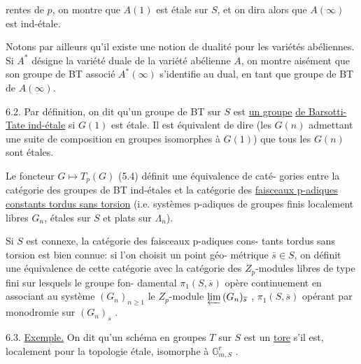 
rentes de $p$, on montre que $A(1)$ est étale sur $S$, et on dira alors
que $A(\infty)$ est ind-étale.

Notons par ailleurs qu'il existe une notion de dualité pour
les variétés abéliennes. Si $A^*$ désigne la variété duale de la variété
abélienne $A$, on montre aisément que son groupe de BT associé $A^*(\infty)$
s'identifie au dual, en tant que groupe de BT de $A(\infty)$.

6.2. Par définition, on dit qu'un groupe de BT sur $S$ est \uline{un groupe}
\uline{de Barsotti-Tate ind-étale} si $G(1)$ est étale. Il est équivalent de dire
(les $G(n)$ admettant une suite de composition en groupes isomorphes à
$G(1)$) que tous les $G(n)$ sont étales.

Le foncteur $G \mapsto T_p(G)$ (5.4) définit une équivalence de caté-%
gories entre la catégorie des groupes de BT ind-étales et la catégorie
des \uline{faisceaux p-adiques constants tordus sans torsion} (i.e. systèmes
p-adiques de groupes finis localement libres $G_n$, étales sur $S$ et plats
sur $\Lambda_n$).

Si $S$ est connexe, la catégorie des faisceaux p-adiques cons-%
tants tordus sans torsion est bien connue: si l'on choisit un point géo-%
métrique $\overline{s} \in S$, on définit une équivalence de cette catégorie avec la
catégorie des $Z_p$-modules libres de type fini sur lesquels le groupe fon-%
damental $\pi_1(S,\overline{s})$ opère continuement en associant au système $(G_n)_{n\geq 1}$
le $Z_p$-module $\varprojlim\, (G_n)_{\overline{s}}$ , $\pi_1(S,\overline{s})$ opérant par monodromie sur $(G_n)_{\overline{s}}$ .

6.3. \uline{Exemple.} On dit qu'un schéma en groupes $T$ sur $S$ est un
\uline{tore} s'il est, localement pour la topologie étale, isomorphe à $\mathbb{G}^r_{m,S}$ .

